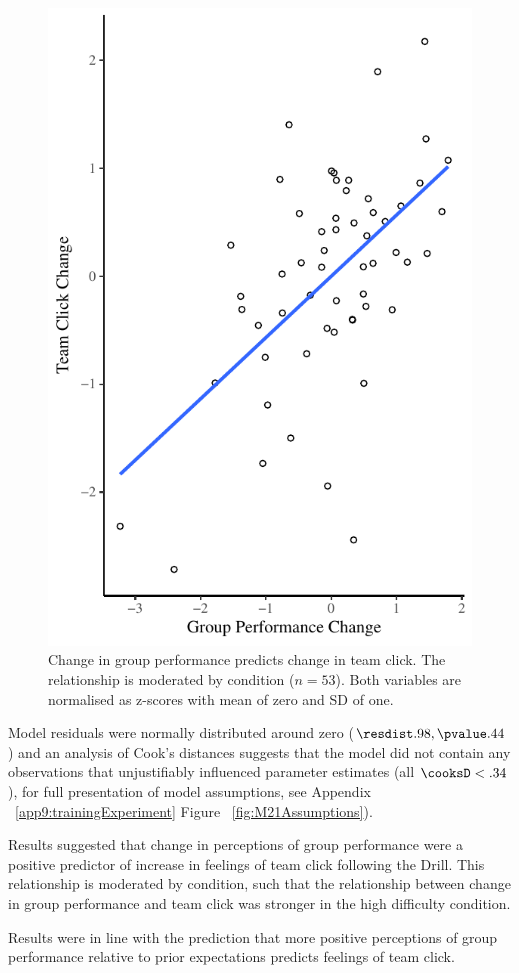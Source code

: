  \begin{figure}
     \centering
     \includegraphics[width=0.5\linewidth,keepaspectratio] {images/groupPerfClickChangeCondition}
     \caption{Change in group performance predicts change in team click.  The relationship is moderated by condition ($n = 53$).  Both variables are normalised as z-scores with mean of zero and SD of one.}
     \label{fig:groupPerfClickChangeCondition}
 \end{figure}

Model residuals were normally distributed around zero ($\resdist .98, \pvalue .44$) and an analysis of Cook's distances suggests that the model did not contain any observations that unjustifiably influenced parameter estimates (all $\cooksD < .34$), for full presentation of model assumptions, see Appendix ~\ref{app9:trainingExperiment} Figure ~\ref{fig:M21Assumptions}).

Results suggested that change in perceptions of group performance were a positive predictor of increase in feelings of team click following the Drill.  This relationship is moderated by condition, such that the relationship between change in group performance and team click was stronger in the high difficulty condition.

Results were in line with the prediction that more positive perceptions of group performance relative to prior expectations predicts feelings of team click.




